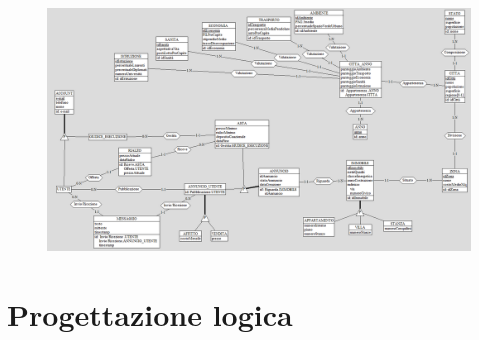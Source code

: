 \documentclass[a4paper,12pt]{report}
\begin{document}
        \begin{figure}[]
            \centering{}
            \includegraphics[angle=90,width=\textwidth,height=\textheight,keepaspectratio]{./images/fourth.png}
        \end{figure}

        	
	\chapter{Progettazione logica} 
\end{document}
